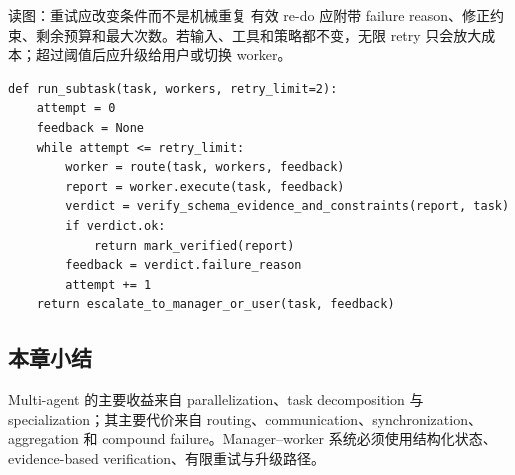 
\begin{knowledgebox}{读图：重试应改变条件而不是机械重复}
有效 re-do 应附带 failure reason、修正约束、剩余预算和最大次数。若输入、工具和策略都不变，无限 retry 只会放大成本；超过阈值后应升级给用户或切换 worker。
\end{knowledgebox}

\begin{lstlisting}[caption={带验证和有限重试的 manager--worker 协议}]
def run_subtask(task, workers, retry_limit=2):
    attempt = 0
    feedback = None
    while attempt <= retry_limit:
        worker = route(task, workers, feedback)
        report = worker.execute(task, feedback)
        verdict = verify_schema_evidence_and_constraints(report, task)
        if verdict.ok:
            return mark_verified(report)
        feedback = verdict.failure_reason
        attempt += 1
    return escalate_to_manager_or_user(task, feedback)
\end{lstlisting}


\subsection{本章小结}

Multi-agent 的主要收益来自 parallelization、task decomposition 与 specialization；其主要代价来自 routing、communication、synchronization、aggregation 和 compound failure。Manager--worker 系统必须使用结构化状态、evidence-based verification、有限重试与升级路径。

